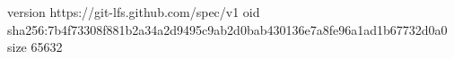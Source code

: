 version https://git-lfs.github.com/spec/v1
oid sha256:7b4f73308f881b2a34a2d9495c9ab2d0bab430136e7a8fe96a1ad1b67732d0a0
size 65632

